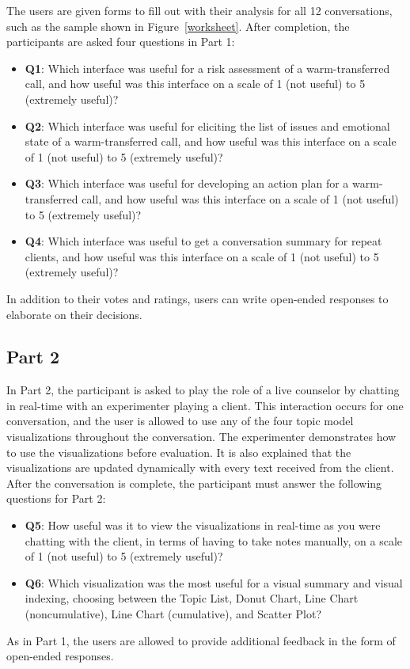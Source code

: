 The users are given forms to fill out with their analysis for all 12 conversations, such as the sample shown in Figure~\ref{worksheet}. After completion, the participants are asked four questions in Part 1:
\begin{itemize}
  \item \textbf{Q1}: Which interface was useful for a risk assessment of a warm-transferred call, and how useful was this interface on a scale of 1 (not useful) to 5 (extremely useful)?
  \item \textbf{Q2}: Which interface was useful for eliciting the list of issues and emotional state of a warm-transferred call, and how useful was this interface on a scale of 1 (not useful) to 5 (extremely useful)?
  \item \textbf{Q3}: Which interface was useful for developing an action plan for a warm-transferred call, and how useful was this interface on a scale of 1 (not useful) to 5 (extremely useful)?
  \item \textbf{Q4}: Which interface was useful to get a conversation summary for repeat clients, and how useful was this interface on a scale of 1 (not useful) to 5 (extremely useful)?
\end{itemize}
In addition to their votes and ratings, users can write open-ended responses to elaborate on their decisions.

\subsection{Part 2}

In Part 2, the participant is asked to play the role of a live counselor by chatting in real-time with an experimenter playing a client. This interaction occurs for one conversation, and the user is allowed to use any of the four topic model visualizations throughout the conversation. The experimenter demonstrates how to use the visualizations before evaluation. It is also explained that the visualizations are updated dynamically with every text received from the client. After the conversation is complete, the participant must answer the following questions for Part 2:
\begin{itemize}
  \item \textbf{Q5}: How useful was it to view the visualizations in real-time as you were chatting with the client, in terms of having to take notes manually, on a scale of 1 (not useful) to 5 (extremely useful)?
  \item \textbf{Q6}: Which visualization was the most useful for a visual summary and visual indexing, choosing between the Topic List, Donut Chart, Line Chart (noncumulative), Line Chart (cumulative), and Scatter Plot?
\end{itemize}
As in Part 1, the users are allowed to provide additional feedback in the form of open-ended responses.

